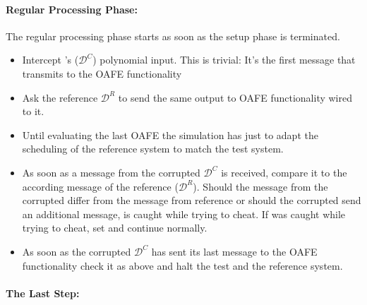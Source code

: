 \paragraph{Regular Processing Phase:}

The regular processing phase starts as soon as the setup phase is terminated.

\begin{itemize}

  \item Intercept \JWpTwo{}'s ($\mathcal{D}^C$) polynomial input. This is
    trivial: It's the first message that \JWpTwo{} transmits to the OAFE
    functionality

  \item Ask the reference \JWpTwo{} $\mathcal{D}^R$ to send the same output to
    OAFE functionality wired to it.

  \item Until evaluating the last OAFE the simulation has just to adapt the
    scheduling of the reference system to match the test system.

  \item As soon as a message from the corrupted \JWpTwo{} $\mathcal{D}^C$ is
    received, compare it to the according message of the reference \JWpTwo{}
    ($\mathcal{D}^R$). Should the message from the corrupted \JWpTwo{} differ
    from the message from reference \JWpTwo{} or should the corrupted \JWpTwo{}
    send an additional message, \JWpTwo{} is caught while trying to cheat. If
    \JWpTwo{} was caught while trying to cheat, set  and continue normally.

  \item As soon as the corrupted $\mathcal{D}^C$ has sent its last message to
    the OAFE functionality check it as above and halt the test and the reference
    system.

\end{itemize}

\paragraph{The Last Step:}

